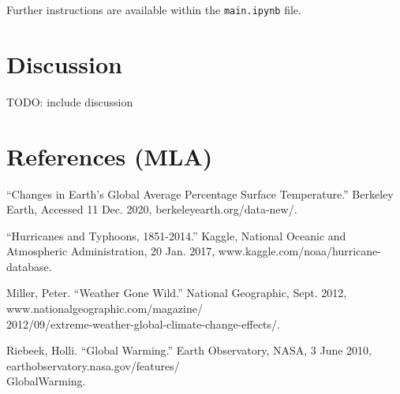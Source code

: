 \documentclass[fontsize=11pt]{article}
\begin{document}
Further instructions are available within the \texttt{main.ipynb} file.

\section*{Discussion}

TODO: include discussion

\section*{References (MLA)}

\begin{hangparas}{0.5in}{1}

“Changes in Earth's Global Average Percentage Surface Temperature.” Berkeley Earth, Accessed 11 Dec. 2020, berkeleyearth.org/data-new/.

\bigskip

“Hurricanes and Typhoons, 1851-2014.” Kaggle, National Oceanic and Atmospheric Administration, 20 Jan. 2017, www.kaggle.com/noaa/hurricane-database.

\bigskip

Miller, Peter. “Weather Gone Wild.” National Geographic, Sept. 2012, www.nationalgeographic.com/magazine/\\2012/09/extreme-weather-global-climate-change-effects/.

\bigskip

Riebeek, Holli. “Global Warming.” Earth Observatory, NASA, 3 June 2010, earthobservatory.nasa.gov/features/\\GlobalWarming.

\end{hangparas}
\end{document}
